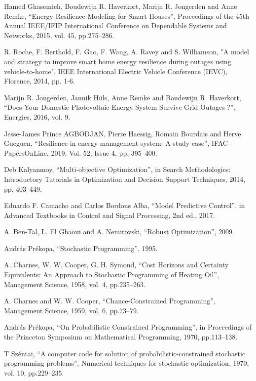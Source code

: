 \documentclass[conference]{IEEEtran}
\begin{document}
\begin{thebibliography}{00}

 Hamed Ghasemieh, Boudewijn R. Haverkort, Marijn R. Jongerden and Anne Remke, ``Energy Resilience Modeling for Smart Houses'', Proceedings of the 45th Annual IEEE/IFIP International Conference on Dependable Systems and Networks, 2015, vol. 45, pp.275--286.

 R. Roche, F. Berthold, F. Gao, F. Wang, A. Ravey and S. Williamson, "A model and strategy to improve smart home energy resilience during outages using vehicle-to-home", IEEE International Electric Vehicle Conference (IEVC), Florence, 2014, pp. 1-6.

 Marijn R. Jongerden, Jannik Hüls, Anne Remke and Boudewijn R. Haverkort, ``Does Your Domestic Photovoltaic Energy System Survive Grid Outages ?'', Energies, 2016, vol. 9.

 Jesse-James Prince AGBODJAN, Pierre Haessig, Romain Bourdais and Herve Gueguen, ``Resilience in energy management system: A study case'', IFAC-PapersOnLine, 2019, Vol. 52, Issue 4, pp. 395--400.

 Deb Kalyanmoy, ``Multi-objective Optimization'', in Search Methodologies: Introductory Tutorials in Optimization and Decision Support Techniques, 2014, pp. 403--449.

 Eduardo F. Camacho and Carlos Bordons Alba, ``Model Predictive Control'', in Advanced Textbooks in Control and Signal Processing, 2nd ed., 2017.

 A. Ben-Tal, L. El Ghaoui  and A. Nemirovski, ``Robust Optimization'', 2009.

 Andr\'as Pr\'ekopa, ``Stochastic Programming'', 1995.

 A. Charnes, W. W. Cooper, G. H. Symond, ``Cost Horizons and Certainty Equivalents: An Approach to Stochastic Programming of Heating Oil'', Management Science, 1958, vol. 4, pp.235--263.

 A. Charnes and W. W. Cooper, ``Chance-Constrained Programming'', Management Science, 1959, vol. 6, pp.73--79.

 Andr\'as Pr\'ekopa, ``On Probabilistic Constrained Programming'', in  Proceedings of the Princeton Symposium on Mathematical Programming, 1970, pp.113--138.

 T Sz\'entai, ``A computer code for solution of probabilistic-constrained stochastic programming problems'', Numerical techniques for stochastic optimization, 1970,  vol. 10, pp.229--235.


\end{thebibliography}
\end{document}
